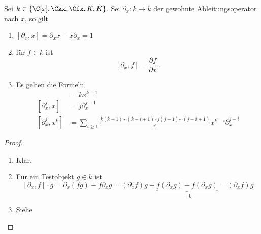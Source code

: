 \begin{prop} \label{prop:d-modul-komutator-regeln}
Sei $k\in \{ \C[x],\Ckx,\Cfx,K,\hat K \}$.
Sei $\partial_x:k\rightarrow k$ der gewohnte Ableitungsoperator
nach $x$, so gilt 
\begin{enumerate}
\item $[ \partial_x,x] = \partial_xx-x\partial_x=1 $
\item für $f\in k$ ist
\[ [\partial_x,f] = \frac{\partial f}{\partial x} \,. \]
\item Es gelten die Formeln\\
\begin{align}
[\partial_x,x^k]   &= kx^{k-1}
  \label{eq:kommutator1}\\
[\partial_x^j,x]   &= j\partial_x^{j-1}
  \label{eq:kommutator2}\\
[\partial_x^j,x^k] &= \sum_{i\geq1}\frac{k(k-1)\cdots(k-i+1)
  \cdot j(j-1)\cdots(j-i+1)}{i!}x^{k-i}\partial_x^{j-i}
  \label{eq:kommutator3}
\end{align}
\end{enumerate}
\end{prop}
\begin{proof}
\begin{enumerate}
\item Klar.
\item Für ein Testobjekt $g\in k$ ist
\[
[\partial_x,f]\cdot g=\partial_x(fg)-f\partial_xg=
  (\partial_xf)g+\underset{=0}{\underbrace{ 
  f(\partial_xg)-f(\partial_xg)}}=
  (\partial_xf)g
\]
\item Siehe \cite[???]{ZulaBarbara}
\end{enumerate}
\end{proof}

